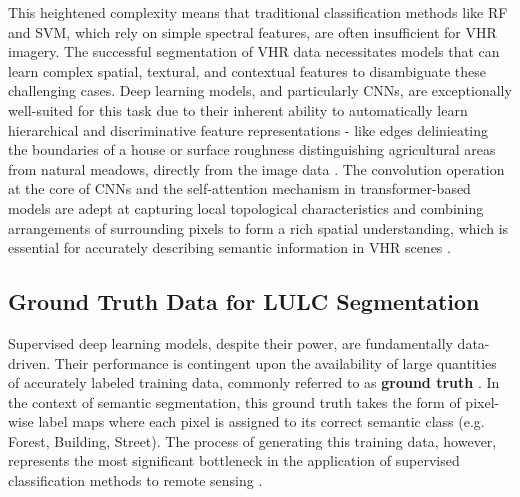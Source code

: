\documentclass{report}
\begin{document}
This heightened complexity means that traditional classification methods like RF and SVM, which rely on simple spectral features, are often insufficient for VHR imagery. The successful segmentation of VHR data necessitates models that can learn complex spatial, textural, and contextual features to disambiguate these challenging cases. Deep learning models, and particularly CNNs, are exceptionally well-suited for this task due to their inherent ability to automatically learn hierarchical and discriminative feature representations - like edges delinieating the boundaries of a house or surface roughness distinguishing agricultural areas from natural meadows, directly from the image data \parencites[p.~3148]{XuEtAlsemanticsegmentationmethodcategoryboundaryLandUseLandCoverLULCmappingVeryHighResolutionVHRremotesensingimage2021}. The convolution operation at the core of CNNs and the self-attention mechanism in transformer-based models are adept at capturing local topological characteristics and combining arrangements of surrounding pixels to form a rich spatial understanding, which is essential for accurately describing semantic information in VHR scenes \parencites[p.~3147]{XuEtAlsemanticsegmentationmethodcategoryboundaryLandUseLandCoverLULCmappingVeryHighResolutionVHRremotesensingimage2021}.
\subsection{Ground Truth Data for LULC Segmentation}
Supervised deep learning models, despite their power, are fundamentally data-driven. Their performance is contingent upon the availability of large quantities of accurately labeled training data, commonly referred to as \textbf{ground truth} \parencites[p.~1f.]{KaiserEtAlLearningAerialImageSegmentationOnlineMaps2017}. In the context of semantic segmentation, this ground truth takes the form of pixel-wise label maps where each pixel is assigned to its correct semantic class (e.g. Forest, Building, Street). The process of generating this training data, however, represents the most significant bottleneck in the application of supervised classification methods to remote sensing \parencites[p.~1]{KaiserEtAlLearningAerialImageSegmentationOnlineMaps2017}.
\end{document}

